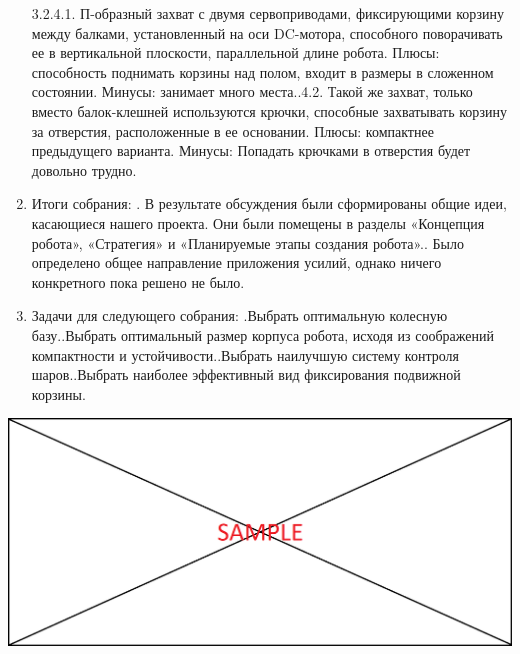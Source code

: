 \documentclass[11pt]{article}
\newcommand\measurepage{\dimexpr\pagegoal-\pagetotal-\baselineskip\relax}
\newcommand\fillpage{\includegraphics[width=\textwidth, height=\measurepage]{img/fill_page}}
\begin{document}
\begin{enumerate}
            3.2.4.1.   П-образный захват с двумя сервоприводами, фиксирующими корзину между балками, установленный на оси DC-мотора, способного поворачивать ее в вертикальной плоскости, параллельной длине робота. Плюсы: способность поднимать корзины над полом, входит в размеры в сложенном состоянии. Минусы: занимает много места..4.2.   Такой же захват, только вместо балок-клешней используются крючки, способные захватывать корзину за отверстия, расположенные в ее основании. Плюсы: компактнее предыдущего варианта. Минусы: Попадать крючками в отверстия будет довольно трудно.\newline
           \item Итоги собрания:
           .   В результате обсуждения были сформированы общие идеи, касающиеся нашего проекта. Они были помещены в разделы «Концепция робота»,  «Стратегия» и «Планируемые этапы создания робота»..   Было определено общее направление приложения усилий, однако ничего конкретного пока решено не было.
           \newline
           \item Задачи для следующего собрания:
           .Выбрать оптимальную колесную базу..Выбрать оптимальный размер корпуса робота, исходя из соображений компактности и устойчивости..Выбрать наилучшую систему контроля шаров..Выбрать наиболее эффективный вид фиксирования подвижной корзины.\newline      
         \end{enumerate}
         
         \fillpage
         
\end{document}

